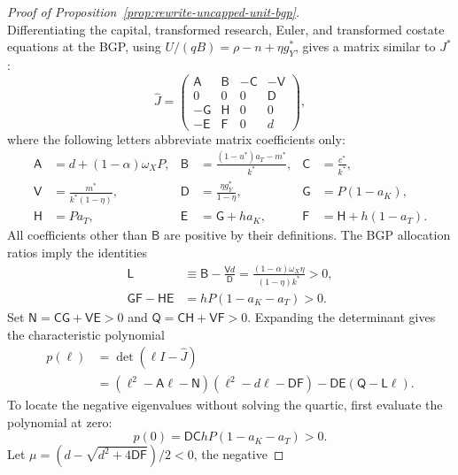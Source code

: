 \begin{proof}[Proof of Proposition~\ref{prop:rewrite-uncapped-unit-bgp}]
\[\]
Differentiating the capital, transformed research, Euler, and transformed
costate equations at the BGP, using
$U/(qB)=\rho-n+\eta g_Y^*$, gives a matrix similar to $J^*$:
\begin{equation}
 \widehat J=
 \begin{pmatrix}
  \mathsf A&\mathsf B&-\mathsf C&-\mathsf V\\
  0&0&0&\mathsf D\\
  -\mathsf G&\mathsf H&0&0\\
  -\mathsf E&\mathsf F&0&d
 \end{pmatrix},
 \label{eq:rewrite-uncapped-unit-local-similarity}
\end{equation}
where the following letters abbreviate matrix coefficients only:
\begin{align*}
 \mathsf A&=d+(1-\alpha)\omega_X P,&
 \mathsf B&=\frac{(1-u^*)a_T-m^*}{k^*},&
 \mathsf C&=\frac{c^*}{k^*},\\
 \mathsf V&=\frac{m^*}{k^*(1-\eta)},&
 \mathsf D&=\frac{\eta g_Y^*}{1-\eta},&
 \mathsf G&=P(1-a_K),\\
 \mathsf H&=Pa_T,&
 \mathsf E&=\mathsf G+ha_K,&
 \mathsf F&=\mathsf H+h(1-a_T).
\end{align*}
All coefficients other than $\mathsf B$ are positive by their definitions.
The BGP allocation
ratios imply the identities
\begin{align}
 \mathsf L&\equiv\mathsf B-\frac{\mathsf Vd}{\mathsf D}
 =\frac{(1-\alpha)\omega_X\eta}{(1-\eta)k^*}>0,
 \label{eq:rewrite-uncapped-unit-local-l}\\
 \mathsf G\mathsf F-\mathsf H\mathsf E
 &=hP(1-a_K-a_T)>0.
 \label{eq:rewrite-uncapped-unit-local-minor}
\end{align}
Set $\mathsf N=\mathsf C\mathsf G+\mathsf V\mathsf E>0$ and
$\mathsf Q=\mathsf C\mathsf H+\mathsf V\mathsf F>0$.
Expanding the determinant gives the characteristic polynomial
\begin{equation}
 \begin{split}
 p(\ell)&=\det(\ell I-\widehat J)\\
 &=(\ell^2-\mathsf A\ell-\mathsf N)
 (\ell^2-d\ell-\mathsf D\mathsf F)
 -\mathsf D\mathsf E(\mathsf Q-\mathsf L\ell).
 \end{split}
 \label{eq:rewrite-uncapped-unit-local-polynomial}
\end{equation}
To locate the negative eigenvalues without solving the quartic, first
evaluate the polynomial at zero:
\[
 p(0)=\mathsf D\mathsf C hP(1-a_K-a_T)>0.
\]
Let $\mu=(d-\sqrt{d^2+4\mathsf D\mathsf F})/2<0$, the negative

\end{proof}

